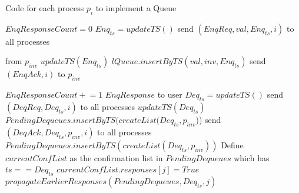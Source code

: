 \documentclass[a4paper,anonymous,USenglish]{lipics-v2021} %
\theoremstyle{definition}
\newcommand{\pluseq}{\mathrel{+}=}
\begin{document}
\begin{algorithm}
  \caption{Code for each process $p_i$ to implement a Queue}\label{alg:fifo}
  \begin{algorithmic}[1]
    \label{fifoline:invEnq}
      \State $EnqResponseCount = 0$ 
      \State $Enq_{ts} = updateTS()$ \label{fifoline:enqTS} 
      \State send $(EnqReq, val, Enq_{ts}, i)$ to all processes\label{fifoline:sendEnqReq}
    \EndFunction

     from $p_{inv}$
      \State $updateTS(Enq_{ts})$ \label{fifoline:enqReqTSUpdate} 
      \State $lQueue.insertByTS(val, inv, Enq_{ts})$\label{fifoline:executeEnq} 
      \State send $(EnqAck, i)$ to $p_{inv}$ \label{fifoline:sendEnqAck} 
    \EndFunction

      \State $EnqResponseCount \pluseq 1$
        \Return $EnqResponse$ to user\label{fifoline:enqReturn} 
      \EndIf
    \EndFunction \label{fifoline:finishEnq}
%
      \State $Deq_{ts} = updateTS()$ \label{fifoline:deqTS}
      \State send $(DeqReq, Deq_{ts}, i)$ to all processes \label{fifoline:sendDeqReq}
    \EndFunction
%
    \State $updateTS(Deq_{ts})$ \label{fifoline:deqReqTSUpdate}
      \State $PendingDequeues.insertByTS(createList(Deq_{ts}, p_{inv}$))\label{fifoline:savePendingDeq}
      \EndIf
      \State send $(DeqAck, Deq_{ts}, p_{inv}, i)$ to all processes \label{fifoline:sendSafetyFlag}\label{fifoline:sendDeqAck}
    \EndFunction
%
        \State $PendingDequeues.insertByTS(createList(Deq_{ts}, p_{inv}))$
      \EndIf
      \State Define $currentConfList$ as the confirmation list in $PendingDequeues$ which has $ts == Deq_{ts}$
      \State $currentConfList.responses[j] = True$ \label{fifoline:setResponse}
      \State $propagateEarlierResponses(PendingDequeues, Deq_{ts}, j)$ \label{fifoline:propagateEarlier} 


\end{algorithmic}
\end{algorithm}
\end{document}
